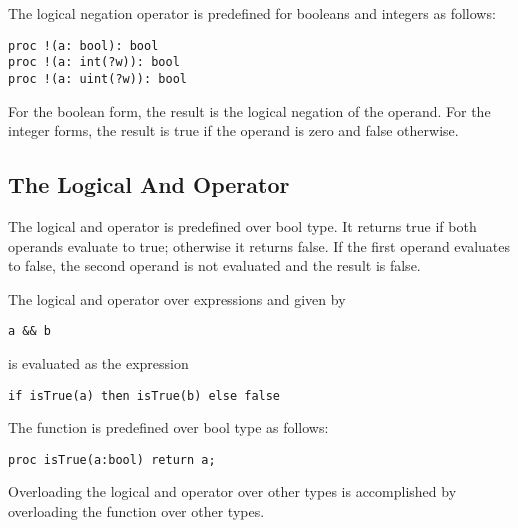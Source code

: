 The logical negation operator is predefined for booleans and integers
as follows:

\begin{chapel}
\begin{verbatim}
proc !(a: bool): bool
proc !(a: int(?w)): bool
proc !(a: uint(?w)): bool
\end{verbatim}
\end{chapel}
For the boolean form, the result is the logical negation of the
operand.  For the integer forms, the result is true if the operand is
zero and false otherwise.

\subsection{The Logical And Operator}
\label{Logical_And_Operators}

The logical and operator is predefined over bool type.  It returns
true if both operands evaluate to true; otherwise it returns false.
If the first operand evaluates to false, the second operand is not
evaluated and the result is false.

The logical and operator over expressions  and  given
by
\begin{chapel}
\begin{verbatim}
a && b 
\end{verbatim}
\end{chapel}
is evaluated as the expression
\begin{chapel}
\begin{verbatim}
if isTrue(a) then isTrue(b) else false
\end{verbatim}
\end{chapel}

The function  is predefined over bool type as follows:
\begin{chapel}
\begin{verbatim}
proc isTrue(a:bool) return a; 
\end{verbatim}
\end{chapel}
Overloading the logical and operator over other types is accomplished
by overloading the  function over other types.

